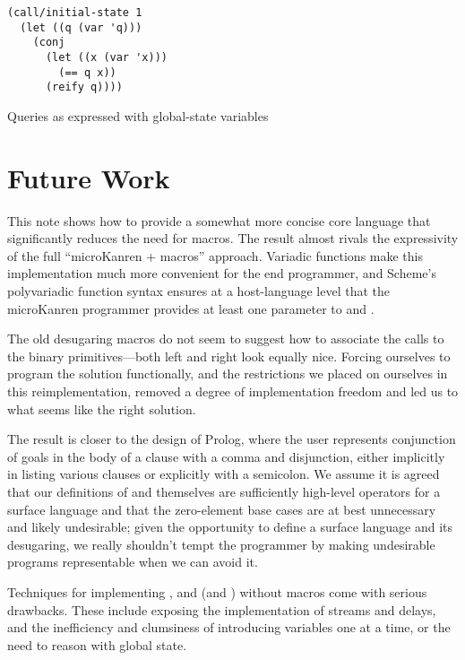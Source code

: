 \documentclass[sigplan,draft,balance,pbalance,natbib=false]{acmart}
\begin{document}
\begin{listing}
  \begin{verbatim}
(call/initial-state 1
  (let ((q (var 'q)))
    (conj
      (let ((x (var 'x)))
        (== q x))
      (reify q))))
  \end{verbatim}
  \caption{Queries as expressed with global-state variables}
  \label{mnt:run-query}
\end{listing}

\section{Future Work}\label{sec:conclusion}

This note shows how to provide a somewhat more concise core language
that significantly reduces the need for macros. The result almost
rivals the expressivity of the full \enquote{microKanren + macros}
approach. Variadic functions make this implementation much more
convenient for the end programmer, and Scheme's polyvariadic function
syntax ensures at a host-language level that the microKanren
programmer provides at least one parameter to 
and .

The old desugaring macros do not seem to suggest how to associate the
calls to the binary primitives---both left and right look equally
nice. Forcing ourselves to program the solution functionally, and the
restrictions we placed on ourselves in this reimplementation, removed
a degree of implementation freedom and led us to what seems like the
right solution.

The result is closer to the design of Prolog, where the user
represents conjunction of goals in the body of a clause with a comma
and disjunction, either implicitly in listing various clauses or
explicitly with a semicolon. We assume it is agreed that our
definitions of  and  themselves are
sufficiently high-level operators for a surface language and that the
zero-element base cases are at best unnecessary and likely
undesirable; given the opportunity to define a surface language and
its desugaring, we really shouldn't tempt the programmer by making
undesirable programs representable when we can avoid it.

Techniques for
implementing ,  and
 (and ) without macros come with
serious drawbacks. These include exposing the implementation of
streams and delays, and the inefficiency and clumsiness of introducing
variables one at a time, or the need to reason with global state.
\end{document}
